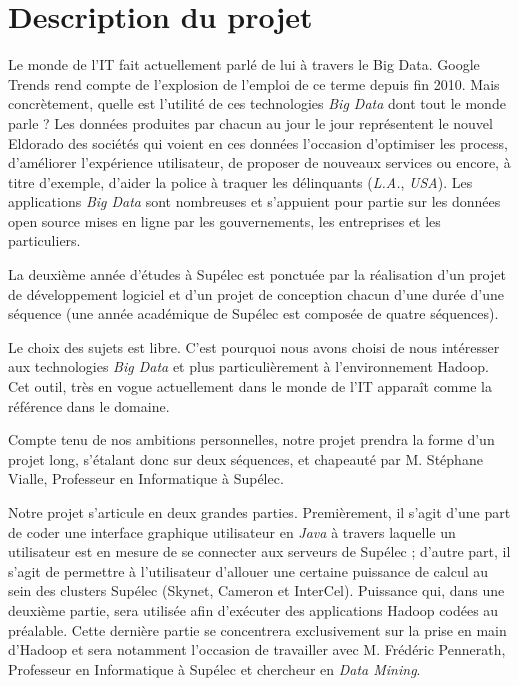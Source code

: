 \section{Description du projet}

\par Le monde de l'IT fait actuellement parlé de lui à travers le Big Data. Google Trends rend compte de l'explosion de l'emploi de ce terme depuis fin 2010. Mais concrètement, quelle est l'utilité de ces technologies \emph{Big Data} dont tout le monde parle ? Les données produites par chacun au jour le jour représentent le nouvel Eldorado des sociétés qui voient en ces données l'occasion d'optimiser les process, d'améliorer l'expérience utilisateur, de proposer de nouveaux services ou encore, à titre d'exemple, d'aider la police à traquer les délinquants (\emph{L.A.}, \emph{USA}). Les applications \emph{Big Data} sont nombreuses et s'appuient pour partie sur les données open source mises en ligne par les gouvernements, les entreprises et les particuliers.

\par La deuxième année d'études à Supélec est ponctuée par la réalisation d'un projet de développement logiciel et d'un projet de conception chacun d'une durée d'une séquence (une année académique de Supélec est composée de quatre séquences).

\par Le choix des sujets est libre. C'est pourquoi nous avons choisi de nous intéresser aux technologies \emph{Big Data} et plus particulièrement à l'environnement Hadoop. Cet outil, très en vogue actuellement dans le monde de l'IT apparaît comme la référence dans le domaine.

\par Compte tenu de nos ambitions personnelles, notre projet prendra la forme d'un projet long, s'étalant donc sur deux séquences, et chapeauté par M. Stéphane Vialle, Professeur en Informatique à Supélec.

\par Notre projet s'articule en deux grandes parties. Premièrement, il s'agit d'une part de coder une interface graphique utilisateur en \emph{Java} à travers laquelle un utilisateur est en mesure de se connecter aux serveurs de Supélec ; d'autre part, il s'agit de permettre à l'utilisateur d'allouer une certaine puissance de calcul au sein des clusters Supélec (Skynet, Cameron et InterCel). Puissance qui, dans une deuxième partie, sera utilisée afin d'exécuter des applications Hadoop codées au préalable. Cette dernière partie se concentrera exclusivement sur la prise en main d'Hadoop et sera notamment l'occasion de travailler avec M. Frédéric Pennerath, Professeur en Informatique à Supélec et chercheur en \emph{Data Mining}.


